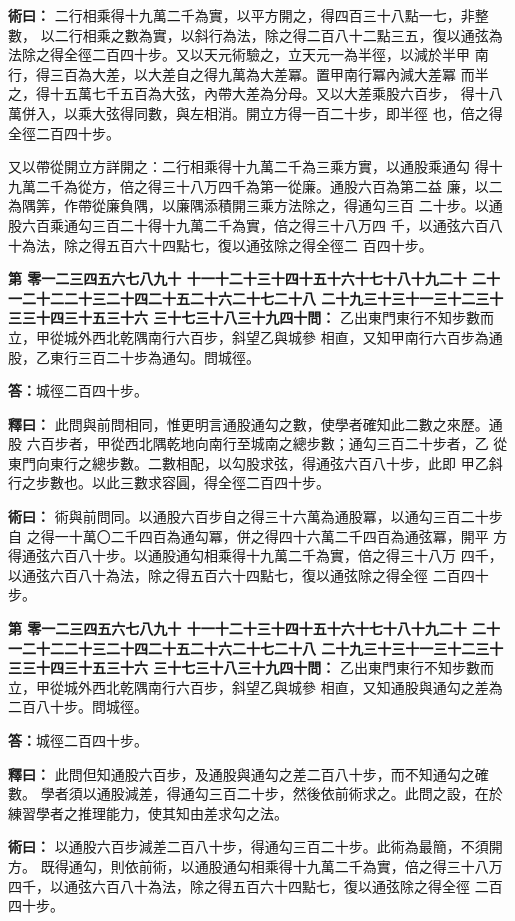 \documentclass[11pt,a4paper]{article}
\newcounter{probnum}
\newcommand{\chnum}[1]{%
  \ifcase#1 零\or 一\or 二\or 三\or 四\or 五\or 六\or 七\or 八\or 九\or 十\or
    十一\or 十二\or 十三\or 十四\or 十五\or 十六\or 十七\or 十八\or 十九\or 二十\or
    二十一\or 二十二\or 二十三\or 二十四\or 二十五\or 二十六\or 二十七\or 二十八\or
    二十九\or 三十\or 三十一\or 三十二\or 三十三\or 三十四\or 三十五\or 三十六\or
    三十七\or 三十八\or 三十九\or 四十\fi}
\newcommand{\problem}[1]{\stepcounter{probnum}\par\noindent\textbf{第\chnum{\value{probnum}}問：}#1\par}
\newcommand{\answer}[1]{\par\noindent\textbf{答：}#1\par}
\newcommand{\shiyi}[1]{\par\noindent\textbf{釋曰：}#1\par}
\newcommand{\shuyue}[1]{\par\noindent\textbf{術曰：}#1\par}
\begin{document}
\shuyue{
二行相乘得十九萬二千為實，以平方開之，得四百三十八點一七，非整數，
以二行相乘之數為實，以斜行為法，除之得二百八十二點三五，復以通弦為
法除之得全徑二百四十步。又以天元術驗之，立天元一為半徑，以減於半甲
南行，得三百為大差，以大差自之得九萬為大差冪。置甲南行冪內減大差冪
而半之，得十五萬七千五百為大弦，內帶大差為分母。又以大差乘股六百步，
得十八萬併入，以乘大弦得同數，與左相消。開立方得一百二十步，即半徑
也，倍之得全徑二百四十步。

又以帶從開立方詳開之：二行相乘得十九萬二千為三乘方實，以通股乘通勾
得十九萬二千為從方，倍之得三十八万四千為第一從廉。通股六百為第二益
廉，以二為隅筭，作帶從廉負隅，以廉隅添積開三乘方法除之，得通勾三百
二十步。以通股六百乘通勾三百二十得十九萬二千為實，倍之得三十八万四
千，以通弦六百八十為法，除之得五百六十四點七，復以通弦除之得全徑二
百四十步。
}

\vspace{0.3cm}
\problem{
乙出東門東行不知步數而立，甲從城外西北乾隅南行六百步，斜望乙與城參
相直，又知甲南行六百步為通股，乙東行三百二十步為通勾。問城徑。
}

\answer{城徑二百四十步。}

\shiyi{
此問與前問相同，惟更明言通股通勾之數，使學者確知此二數之來歷。通股
六百步者，甲從西北隅乾地向南行至城南之總步數；通勾三百二十步者，乙
從東門向東行之總步數。二數相配，以勾股求弦，得通弦六百八十步，此即
甲乙斜行之步數也。以此三數求容圓，得全徑二百四十步。
}

\shuyue{
術與前問同。以通股六百步自之得三十六萬為通股冪，以通勾三百二十步自
之得一十萬〇二千四百為通勾冪，併之得四十六萬二千四百為通弦冪，開平
方得通弦六百八十步。以通股通勾相乘得十九萬二千為實，倍之得三十八万
四千，以通弦六百八十為法，除之得五百六十四點七，復以通弦除之得全徑
二百四十步。
}

\vspace{0.3cm}
\problem{
乙出東門東行不知步數而立，甲從城外西北乾隅南行六百步，斜望乙與城參
相直，又知通股與通勾之差為二百八十步。問城徑。
}

\answer{城徑二百四十步。}

\shiyi{
此問但知通股六百步，及通股與通勾之差二百八十步，而不知通勾之確數。
學者須以通股減差，得通勾三百二十步，然後依前術求之。此問之設，在於
練習學者之推理能力，使其知由差求勾之法。
}

\shuyue{
以通股六百步減差二百八十步，得通勾三百二十步。此術為最簡，不須開方。
既得通勾，則依前術，以通股通勾相乘得十九萬二千為實，倍之得三十八万
四千，以通弦六百八十為法，除之得五百六十四點七，復以通弦除之得全徑
二百四十步。
}
\end{document}
